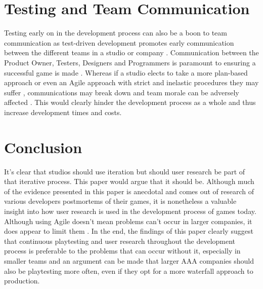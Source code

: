 \documentclass{scrartcl}
\begin{document}
\section{Testing and Team Communication}

Testing early on in the development process can also be a boon to team communication as test-driven development promotes early communication between the different teams in a studio or company \cite{gallardo2009continuous,}. Communication between the Product Owner, Testers, Designers and Programmers is paramount to ensuring a successful game is made \cite{mcdaniel2015communication,}. 
Whereas if a studio elects to take a more plan-based approach or even an Agile approach with strict and inelastic procedures they may suffer \cite{cooke2012everything,} \cite{davis2012agile,}, communications may break down and team morale can be adversely affected \cite{cunningham2005costs,}. This would clearly hinder the development process as a whole and thus increase development times and costs.


\section{Conclusion}

It's clear that studios should use iteration \cite{al2014towards,} \cite{o2015towards,} but should user research be part of that iterative process. This paper would argue that it should be. Although much of the evidence presented in this paper is anecdotal and comes out of research of various developers postmortems of their games, it is nonetheless a valuable insight into how user research is used in the development process of games today. Although using Agile doesn't mean problems can't occur in larger companies, it does appear to limit them \cite{rico2009business,} \cite{batra2010balancing,}. In the end, the findings of this paper clearly suggest that continuous playtesting and user research throughout the development process is preferable to the problems that can occur without it, especially in smaller teams and an argument can be made that larger AAA companies should also be playtesting more often, even if they opt for a more waterfall approach to production.



\end{document}
